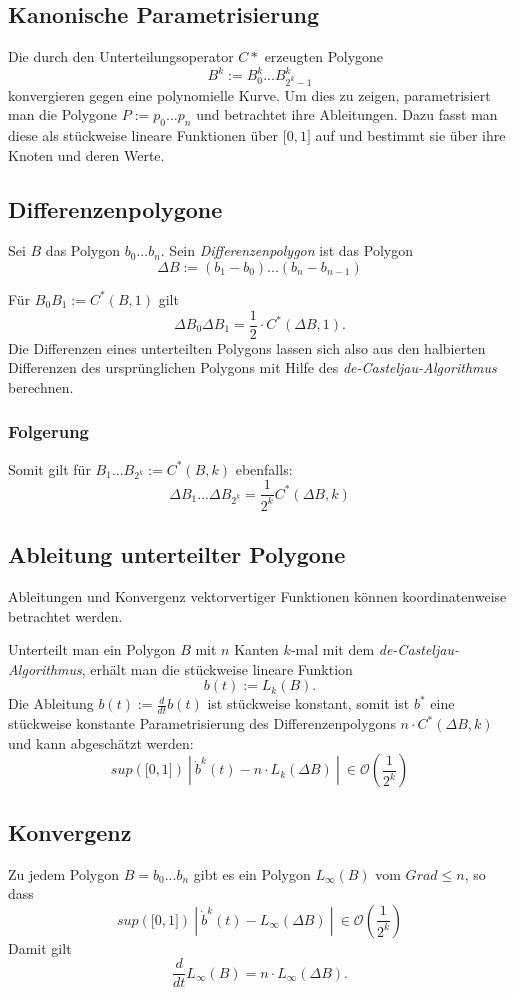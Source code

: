 \subsection{Kanonische Parametrisierung}
Die durch den Unterteilungsoperator \(C*\) erzeugten Polygone
\[B^k := B_0^k...B_{2^k-1}^k\]
konvergieren gegen eine polynomielle Kurve. Um dies zu zeigen, parametrisiert man die Polygone \(P:=p_0...p_n\) und betrachtet ihre Ableitungen. Dazu fasst man diese als stückweise lineare Funktionen über \(\lbrack 0,1 \rbrack\) auf und bestimmt sie über ihre Knoten und deren Werte.


\subsection{Differenzenpolygone}
Sei \(B\) das Polygon \(b_0...b_n\). Sein \textit{Differenzenpolygon} ist das Polygon
\[\Delta B := (b_1-b_0)...(b_n-b_{n-1})\]

Für \(B_0B_1 := C^*(B,1)\) gilt
\[\Delta B_0\Delta B_1 = \frac{1}{2}\cdot C^*(\Delta B,1).\]
Die Differenzen eines unterteilten Polygons lassen sich also aus den halbierten Differenzen des ursprünglichen Polygons mit Hilfe des \textit{de-Casteljau-Algorithmus} berechnen.

\subsubsection{Folgerung}
Somit gilt für \(B_1...B_{2^k} := C^*(B,k)\) ebenfalls:
\[\Delta B_1...\Delta B_{2^k} = \frac{1}{2^k}C^*(\Delta B,k)\]


\subsection{Ableitung unterteilter Polygone}
Ableitungen und Konvergenz vektorvertiger Funktionen können koordinatenweise betrachtet werden.

Unterteilt man ein Polygon \(B\) mit \(n\) Kanten \(k\)-mal mit dem \textit{de-Casteljau-Algorithmus}, erhält man die stückweise lineare Funktion
\[b(t) := L_k(B).\]
Die Ableitung \(b(t) := \frac{d}{dt}b(t)\) ist stückweise konstant, somit ist \(b^*\) eine stückweise konstante Parametrisierung des Differenzenpolygons \(n \cdot C^*(\Delta B,k)\) und kann abgeschätzt werden:
\[sup(\lbrack0,1\rbrack)~|~\dot{b}^k(t)-n\cdot L_k(\Delta B)~|~\in \mathcal{O}(\frac{1}{2^k})\]


\subsection{Konvergenz}
Zu jedem Polygon \(B=b_0...b_n\) gibt es ein Polygon \(L_{\infty}(B)\) vom \(Grad \leq n\), so dass
\[sup(\lbrack0,1\rbrack)~|~\dot{b}^k(t)-L_{\infty}(\Delta B)~|~\in \mathcal{O}(\frac{1}{2^k})\]
Damit gilt
\[\frac{d}{dt}L_{\infty}(B) = n \cdot L_{\infty}(\Delta B).\]



